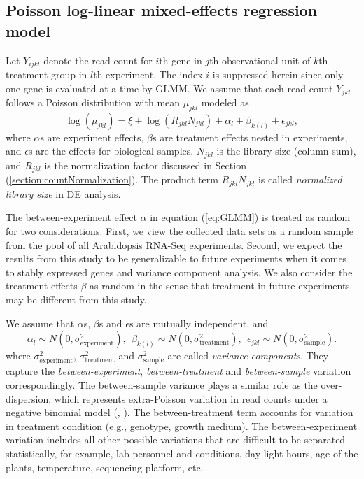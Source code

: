 \documentclass[11pt, a4paper]{article}
\begin{document}
\subsection{Poisson log-linear mixed-effects regression model}\label{subsection:OurMethod} 


Let $Y_{ijkl}$ denote the read count for $i$th gene
in $j$th observational unit of $k$th treatment group in $l$th experiment.
The index $i$ is suppressed herein since only one gene is evaluated at a time
by GLMM. We assume that each read count $Y_{jkl}$ follows a Poisson
distribution with mean $\mu_{jkl}$ modeled as
\begin{equation}\label{eq:GLMM}
    \log( \mu_{jkl}) = \xi + \log(R_{jkl}N_{jkl})+ \alpha_l + \beta_{k(l)} + \epsilon_{jkl},
\end{equation}
where $\alpha$s are experiment effects,  $\beta$s are treatment effects
nested in experiments, and $\epsilon$s are the effects for biological samples. 
$N_{jkl}$ is the library size (column sum), and $R_{jkl}$ is the normalization factor discussed in Section (\ref{section:countNormalization}). The product term $R_{jkl}N_{jkl}$ is called \textit{normalized library size} in DE analysis. 

The between-experiment effect $\alpha$ in equation (\ref{eq:GLMM}) is treated as random for two considerations. First, we view the collected data sets as a random sample from the pool of all Arabidopsis RNA-Seq experiments. Second, we expect the results from this study to be generalizable to future experiments when it comes to stably expressed genes and variance component analysis.
We also consider the treatment effects $\beta$ as random 
in the sense that treatment in future experiments may be different from this study.

We assume that $\alpha$s, $\beta$s and $\epsilon$s are mutually independent, and  
  \[\alpha_l\sim N(0, \sigma^2_{\text{experiment}}),~~
  \beta_{k(l)}\sim N(0, \sigma^2_{\text{treatment}}),~~
  \epsilon_{jkl}\sim N(0, \sigma_{\text{sample}}^2).\]
where $\sigma_{\text{experiment}}^2$, $\sigma_{\text{treatment}}^2$ and $\sigma_{\text{sample}}^2$  are called \textit{variance-components}. They capture the
\textit{between-experiment}, \textit{between-treatment} and \textit{between-sample} variation
correspondingly. The between-sample variance plays a similar role as the over-dispersion, which represents extra-Poisson variation in read counts under a negative binomial model (\cite{anders2010differential}, \cite{di2011nbp}).  The between-treatment term accounts for variation in treatment condition (e.g., genotype, growth medium). 
The between-experiment variation includes all other possible variations that are difficult to be separated statistically, for example, lab personnel and conditions, day light hours, age of the plants, temperature, sequencing platform, etc.
\end{document}
